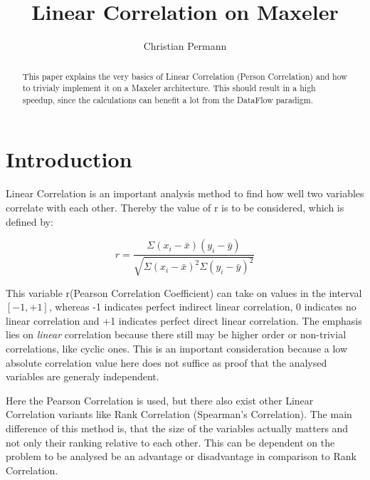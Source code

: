 \documentclass{llncs}
\begin{document}
\title{Linear Correlation on Maxeler}

\author{Christian Permann}

\maketitle

\begin{abstract}
This paper explains the very basics of Linear Correlation (Person Correlation) and how to trivialy implement it on a Maxeler architecture. This should result in a high speedup, since the calculations can benefit a lot from the DataFlow paradigm.
\end{abstract}

\tableofcontents

\section{Introduction}\label{sec:into}
Linear Correlation is an important analysis method to find how well two variables correlate with each other. Thereby the value of r is to be considered, which is defined by:

$$r = \frac{\Sigma(x_i - \bar{x})(y_i - \bar{y})}{\sqrt{\Sigma(x_i - \bar{x})^2\Sigma(y_i - \bar{y})^2}}$$
\newline

This variable r(Pearson Correlation Coefficient) can take on values in the interval \(\left[-1, +1\right]\), whereas -1 indicates perfect indirect linear correlation, 0 indicates no linear correlation and +1 indicates perfect direct linear correlation. The emphasis lies on \emph{linear} correlation because there still may be higher order or non-trivial correlations, like cyclic ones. This is an important consideration because a low absolute correlation value here does not suffice as proof that the analysed variables are generaly independent. 

Here the Pearson Correlation is used, but there also exist other Linear Correlation variants like Rank Correlation (Spearman's Correlation). The main difference of this method is, that the size of the variables actually matters and not only their ranking relative to each other. This can be dependent on the problem to be analysed be an advantage or disadvantage in comparison to Rank Correlation.
\end{document}
